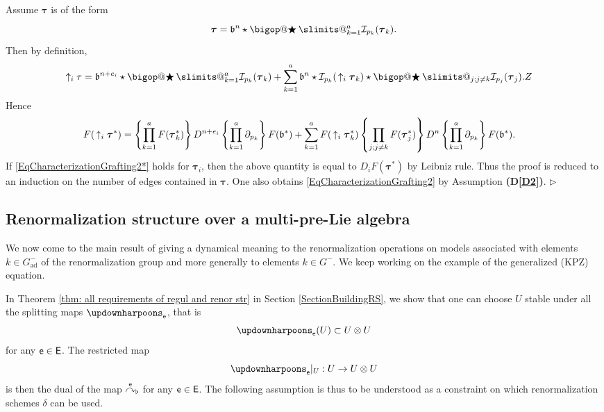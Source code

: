 \documentclass[10pt, reqno]{amsart}
\makeatletter
\numberwithin{subsection}{section}
\numberwithin{subsubsection}{subsection}
\numberwithin{equation}{section} %
\newenvironment{Dem}[1][\unskip]{%
    \begin{list}{\hspace{1.15cm}{\sf \textbf{{\small Proof #1 --}}}}{%
        \setlength{\topsep}{0pt}%
        \setlength{\leftmargin}{0pt}%
        \setlength{\rightmargin}{0pt}%
        \setlength{\listparindent}{0pt}%
        \setlength{\itemindent}{0pt}%
        \setlength{\parsep}{0pt}%
        \addtolength{\leftmargin}{0pt}%
        \addtolength{\rightmargin}{0pt}%
    } \item }{\hfill $\rhd$\end{list}\smallskip}
\theoremstyle{mystyle}
\theoremstyle{mystyle2}
\theoremstyle{mystyle3}
\newcommand{\refD}[1]{\textbf{\textsf{(D\ref{#1})}}}
\DeclareRobustCommand\bigop[1]{%
  \mathop{\vphantom{\sum}\mathpalette\bigop@{#1}}\slimits@
}
\newcommand{\bigop@}[2]{%
  \vcenter{%
    \sbox\z@{$#1\sum$}%
    \hbox{\resizebox{\ifx#1\displaystyle.9\fi\dimexpr\ht\z@+\dp\z@}{!}{$\m@th#2$}}%
  }%
}
\newcommand{\Bigstar}{\DOTSB\bigop{\bigstar}}
\newcommand{\bstau}{\boldsymbol{\tau}}
\newcommand{\flatgrafting}{\overset{\sf e}{\curvearrowright}_{\flat}}
\newcommand{\mcI}{\mathcal{I}}
\makeatother
\begin{document}
\medskip

\begin{Dem}
Assume $\bstau$ is of the form
$$
\bstau = \frak{b}^n\star\Bigstar_{k=1}^a \mcI_{p_k}(\bstau_k).
$$
Then by definition,
\begin{align*}
\uparrow_i\tau
&= \frak{b}^{n+e_i}\star\Bigstar_{k=1}^a \mcI_{p_k}(\bstau_k)
+ \sum_{k=1}^a
\frak{b}^n\star\mcI_{p_k}(\, \uparrow_i\bstau_k)
\star\Bigstar_{j;j\neq k}\mcI_{p_j}(\bstau_j).  Z
\end{align*}
Hence
\begin{align*}
F(\,\uparrow_i\bstau^*)
&= \left\{\prod_{k=1}^a F(\bstau_k^*)\right\}D^{n+e_i}\left\{\prod_{k=1}^a \partial_{{p_k}}\right\}F(\frak{b}^*)
+ \sum_{k=1}^aF(\,\uparrow_i\bstau_k^*)\left\{\prod_{j;j\neq k} F(\bstau_j^*)\right\}D^n\left\{\prod_{k=1}^a \partial_{{p_k}}\right\}F(\frak{b}^*).  
\end{align*}
If \eqref{EqCharacterizationGrafting2*} holds for $\bstau_i$, then the above quantity is equal to $D_iF(\bstau^*)$ by Leibniz rule. Thus the proof is reduced to an induction on the number of edges contained in $\bstau$.   
One also obtains \eqref{EqCharacterizationGrafting2} by Assumption \refD{D2}.
\end{Dem}


\bigskip


\subsection{Renormalization structure over a multi-pre-Lie algebra}
\label{SectionrenormalizationMultiPreLie}

We now come to the main result of \cite{BCCH18} giving a dynamical meaning to the renormalization operations on models associated with elements $k\in G^-_\textrm{ad}$ of the renormalization group and more generally to elements $k\in G^-$. We keep working on the example of the generalized (KPZ) equation.





\medskip

In Theorem \ref{thm: all requirements of regul and renor str} in Section \ref{SectionBuildingRS}, we show that one can choose $U$ stable under all 
the splitting maps $\updownharpoons_{\sf e}$, that is
\begin{equation} \label{EqSplittingU}
\updownharpoons_{\sf e}(U)\subset U\otimes U
\end{equation}
for any ${\sf e}\in {\sf E}$. The restricted map 
$$
{\updownharpoons_{\sf e}}\vert_{U} : U\to U\otimes U
$$ 
is then the dual of the map $\flatgrafting$ for any ${\sf e}\in{\sf E}$. The following assumption is thus to be understood as a constraint on which renormalization schemes $\delta$ can be used.
\end{document}

